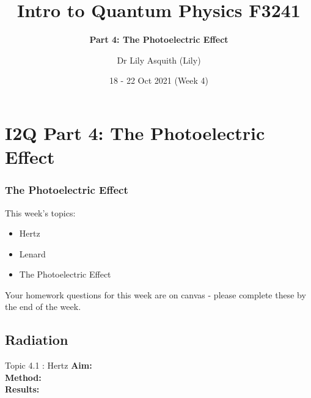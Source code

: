 


% 
\title[ Intro to Quantum Physics]{Intro to Quantum Physics F3241}
\subtitle{\textbf{Part 4: The Photoelectric Effect}}
\author[Dr Lily Asquith (Lily)]{ Dr Lily Asquith (Lily)}
\date[18 - 22 Oct 2021]{ 18 - 22 Oct 2021 (Week 4)}





\begin{frame}
\titlepage
\end{frame} 

\section{I2Q Part 4: The Photoelectric Effect}
\begin{frame}
\frametitle{The Photoelectric Effect} 
\normalsize

This week's topics:\\[3ex]

\begin{itemize}
\item[4.1] Hertz\\[3ex]
\item[4.2] Lenard\\[3ex]
\item[4.3] The Photoelectric Effect\\[3ex]
\end{itemize}

Your homework questions for this week are on canvas - please complete these by the end of the week.
\end{frame} 
 
 
 \subsection{Radiation}

\begin{frame}{Topic 4.1 : Hertz}
\small
\textbf{Aim:}\\
\textbf{Method:}\\
\textbf{Results:}\\
\end{frame}


